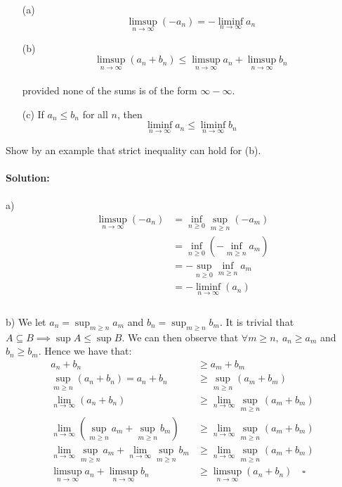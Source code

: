 \documentclass{article}
\begin{document}
\begin{enumerate}
    \item[(a)]  \[\limsup_{n\to\infty} (-a_n) = - \liminf_{n\to\infty} a_n \]
    \item[(b)]  \[\limsup_{n\to\infty} (a_n + b_n) \le \limsup_{n\to\infty} a_n + \limsup_{n\to\infty} b_n \]\\
    provided none of the sums is of the form $\infty - \infty$.
    \item[(c)] If $a_n \le b_n$ for all $n$, then 
        \[ \liminf_{n\to\infty} a_n \le \liminf_{n\to\infty} b_n\]
\end{enumerate}
Show by an example that strict inequality can hold for (b).
\\\\
\textbf{Solution:}
\\\\
a) 
\begin{equation*}
    \begin{aligned}
        \limsup_{n\to\infty} (-a_n) &= \inf_{n\ge0} \sup_{m\ge n} (-a_m)\\
        &= \inf_{n\ge0} (- \inf_{m\ge n} a_m)\\
        &= - \sup_{n\ge0} \inf_{m\ge n} a_m\\
        & = - \liminf_{n\to\infty} (a_n)\\
    \end{aligned}
\end{equation*}
\\
b)
We let $a_n = \sup_{m \ge n} a_m$ and $ b_n = \sup_{m \ge n} b_m$.
It is trivial that $A \subseteq B \implies \sup A \le \sup B$.
We can then observe that $\forall m \ge n,\ a_n \ge a_m$ and $b_n \ge b_m$. Hence we have that: 
\begin{equation*}
    \begin{aligned}
        a_n + b_n &\ge a_m + b_m \\
        \sup_{m \ge n} (a_n + b_n) = a_n + b_n &\ge \sup_{m \ge n} (a_m + b_m)\\
        \lim_{n\to\infty} (a_n + b_n) &\ge \lim_{n\to\infty}\sup_{m \ge n} (a_m + b_m)\\
        \lim_{n\to\infty} (\sup_{m \ge n} a_m + \sup_{m \ge n} b_m) &\ge \lim_{n\to\infty}\sup_{m \ge n} (a_m + b_m)\\
        \lim_{n\to\infty}\sup_{m \ge n} a_m + \lim_{n\to\infty}\sup_{m \ge n} b_m &\ge \lim_{n\to\infty}\sup_{m \ge n} (a_m + b_m)\\
        \limsup_{n\to\infty} a_n + \limsup_{n\to\infty} b_n &\ge \limsup_{n\to\infty}(a_n +b_n) \quad \square   
    \end{aligned}
\end{equation*}
\end{document}

